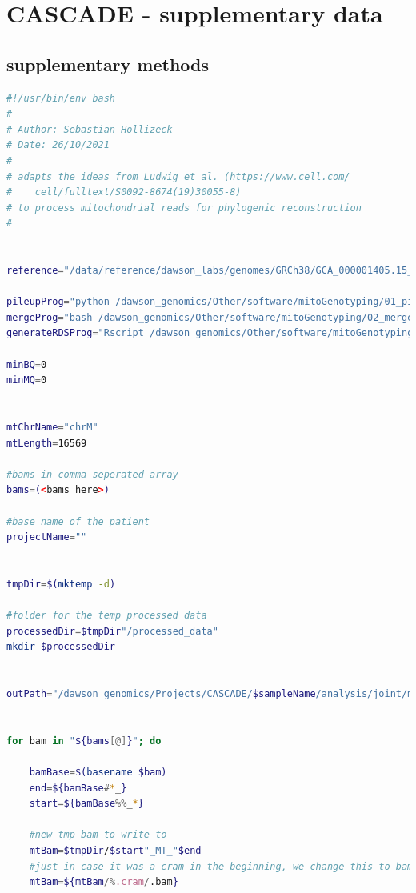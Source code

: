 \chapter[CASCADE - supplementary data]{CASCADE - supplementary data}
\label{ch-cascadeSuppMeth}


\section{supplementary methods}



\begin{lstlisting}[language=bash, caption=Preprocessing of mitochondrial reads and variants for analysis in R, label={lst-cascadeAppendix:mitoPreProcessing}]
#!/usr/bin/env bash
#
# Author: Sebastian Hollizeck
# Date: 26/10/2021
#
# adapts the ideas from Ludwig et al. (https://www.cell.com/
#    cell/fulltext/S0092-8674(19)30055-8)
# to process mitochondrial reads for phylogenic reconstruction
#


reference="/data/reference/dawson_labs/genomes/GRCh38/GCA_000001405.15_GRCh38_full_analysis_set.fna"

pileupProg="python /dawson_genomics/Other/software/mitoGenotyping/01_pileup_counts.py"
mergeProg="bash /dawson_genomics/Other/software/mitoGenotyping/02_merge_pileup_counts.sh"
generateRDSProg="Rscript /dawson_genomics/Other/software/mitoGenotyping/03_makeRDS.R"

minBQ=0
minMQ=0


mtChrName="chrM"
mtLength=16569

#bams in comma seperated array
bams=(<bams here>)

#base name of the patient
projectName=""


tmpDir=$(mktemp -d)

#folder for the temp processed data
processedDir=$tmpDir"/processed_data"
mkdir $processedDir


outPath="/dawson_genomics/Projects/CASCADE/$sampleName/analysis/joint/mito"


for bam in "${bams[@]}"; do

    bamBase=$(basename $bam)
    end=${bamBase#*_}
    start=${bamBase%%_*}

    #new tmp bam to write to
    mtBam=$tmpDir/$start"_MT_"$end
    #just in case it was a cram in the beginning, we change this to bam
    mtBam=${mtBam/%.cram/.bam}


\end{lstlisting}
